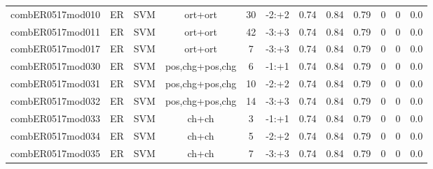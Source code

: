 \documentclass[a4paper]{article}
\begin{document}
\begin{landscape}
\begin{center}
\begin{tabular}{ |c|c|c|c|c|c|c|c|c|c|c|c|}
 	
 
 	
 		
 		\small{ combER0517mod010 } & ER & SVM & ort+ort  &  30 &  -2:+2  &  0.74 & 0.84 & 0.79  &  0 & 0 & 0.0 \\
 		

 	
 
 	
 		
 		\small{ combER0517mod011 } & ER & SVM & ort+ort  &  42 &  -3:+3  &  0.74 & 0.84 & 0.79  &  0 & 0 & 0.0 \\
 		

 	
 
 	
 		
 		\small{ combER0517mod017 } & ER & SVM & ort+ort  &  7 &  -3:+3  &  0.74 & 0.84 & 0.79  &  0 & 0 & 0.0 \\
 		

 	
 
 	
 		
 		\small{ combER0517mod030 } & ER & SVM & pos,chg+pos,chg  &  6 &  -1:+1  &  0.74 & 0.84 & 0.79  &  0 & 0 & 0.0 \\
 		

 	
 
 	
 		
 		\small{ combER0517mod031 } & ER & SVM & pos,chg+pos,chg  &  10 &  -2:+2  &  0.74 & 0.84 & 0.79  &  0 & 0 & 0.0 \\
 		

 	
 
 	
 		
 		\small{ combER0517mod032 } & ER & SVM & pos,chg+pos,chg  &  14 &  -3:+3  &  0.74 & 0.84 & 0.79  &  0 & 0 & 0.0 \\
 		

 	
 
 	
 		
 		\small{ combER0517mod033 } & ER & SVM & ch+ch  &  3 &  -1:+1  &  0.74 & 0.84 & 0.79  &  0 & 0 & 0.0 \\
 		

 	
 
 	
 		
 		\small{ combER0517mod034 } & ER & SVM & ch+ch  &  5 &  -2:+2  &  0.74 & 0.84 & 0.79  &  0 & 0 & 0.0 \\
 		

 	
 
 	
 		
 		\small{ combER0517mod035 } & ER & SVM & ch+ch  &  7 &  -3:+3  &  0.74 & 0.84 & 0.79  &  0 & 0 & 0.0 \\
 		

 	
 

\end{tabular}
\end{center}
\end{landscape}
\end{document}
